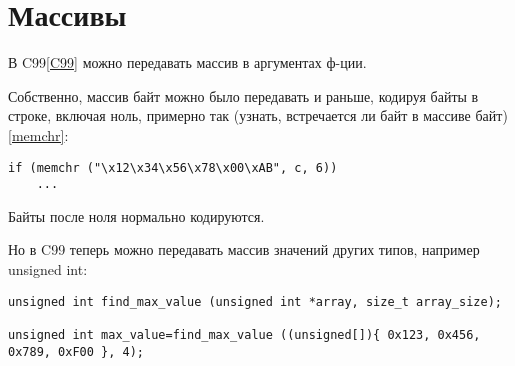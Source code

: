 ﻿\section{Массивы}

В C99\ref{C99} можно передавать массив в аргументах ф-ции.

Собственно, массив байт можно было передавать и раньше, кодируя байты в строке, включая ноль, примерно так
(узнать, встречается ли байт  в массиве байт)\ref{memchr}:

\begin{lstlisting}
if (memchr ("\x12\x34\x56\x78\x00\xAB", c, 6))
	...
\end{lstlisting}

Байты после ноля нормально кодируются.

Но в C99 теперь можно передавать массив значений других типов, например unsigned int:

\begin{lstlisting}
unsigned int find_max_value (unsigned int *array, size_t array_size);

unsigned int max_value=find_max_value ((unsigned[]){ 0x123, 0x456, 0x789, 0xF00 }, 4);
\end{lstlisting}


